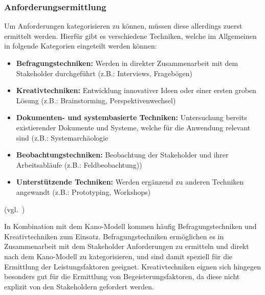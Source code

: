 \subsubsection{Anforderungsermittlung}\label{subsubsec:anforderungsermittlung}
Um Anforderungen kategorisieren zu können, müssen diese allerdings zuerst ermittelt werden.
Hierfür gibt es verschiedene Techniken, welche im Allgemeinen in folgende Kategorien eingeteilt werden können:

\begin{itemize}
    \item \textbf{Befragungstechniken:} Werden in direkter Zusammenarbeit mit dem Stakeholder durchgeführt (z.B.: Interviews, Fragebögen)
    \item \textbf{Kreativtechniken:} Entwicklung innovativer Ideen oder einer ersten groben Lösung (z.B.: Brainstorming, Perspektivenwechsel)
    \item \textbf{Dokumenten- und systembasierte Techniken:} Untersuchung bereits existierender Dokumente und Systeme,
    welche für die Anwendung relevant sind (z.B.: Systemarchäologie
    \item \textbf{Beobachtungstechniken:} Beobachtung der Stakeholder und ihrer Arbeitsabläufe (z.B.: Feldbeobachtung))
    \item \textbf{Unterstützende Techniken:} Werden ergänzend zu anderen Techniken angewandt (z.B.: Prototyping, Workshops)
\end{itemize} (vgl.~\autocite{Maulhardt.b})

In Kombination mit dem Kano-Modell kommen häufig Befragungstechniken und Kreativtechniken zum Einsatz.
Befragungstechniken ermöglichen es in Zusammenarbeit mit dem Stakeholder Anforderungen zu ermitteln und direkt nach dem
Kano-Modell zu kategorisieren,
und sind damit speziell für die Ermittlung der Leistungsfaktoren geeignet.
Kreativtechniken eignen sich hingegen besonders gut für die Ermittlung von Begeisterungsfaktoren, da diese nicht explizit
von den Stakeholdern gefordert werden.